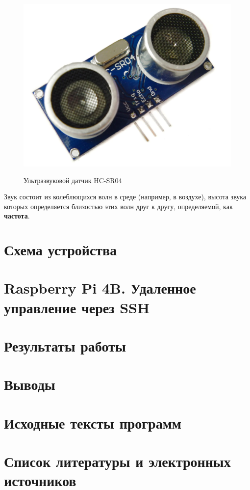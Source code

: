 \documentclass[a4paper, 14pt]{article}
\begin{document}
\begin{figure}[H]
	\centering
	\includegraphics[width=15cm]{screenshots/1.png}\\
	\caption{Ультразвуковой датчик HC-SR04}
\end{figure}

Звук состоит из колеблющихся волн в среде (например, в воздухе), высота звука которых определяется близостью этих волн друг к другу, определяемой, как \textbf{частота}.

\newpage
\section{Схема устройства}

\newpage
\section{Raspberry Pi 4B. Удаленное управление через SSH}

\newpage
\section{Результаты работы}

\newpage
\section{Выводы}

\newpage
\section{Исходные тексты программ}

\newpage
\section{Список литературы и электронных источников}
\end{document}
